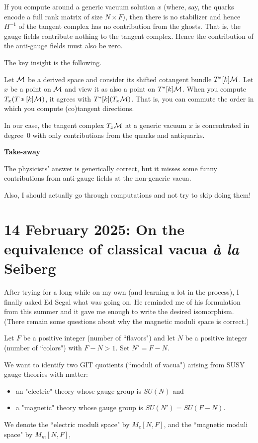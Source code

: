 \documentclass[11pt]{amsart}
\begin{document}
If you compute around a generic vacuum solution $x$ (where, say, the quarks encode a full rank matrix  of size $N \times F$), then there is no stabilizer and hence $H^{-1}$ of the tangent complex has no contribution from the ghosts. That is, the gauge fields contribute nothing to the tangent complex. Hence the contribution of the anti-gauge fields must also be zero.

The key insight is the following. 

Let $\mathcal M$ be a derived space and consider its shifted cotangent bundle $T^*[k]\mathcal M$. Let $x$ be a point on $\mathcal M$ and view it as also a point on $T^*[k]\mathcal M$. When you compute $T_x(T*[k]\mathcal M)$, it agrees with $T^*[k](T_x \mathcal M)$.  That is, you can commute the order in which you compute (co)tangent directions.

In our case, the tangent complex $T_x \mathcal M$ at a generic vacuum $x$ is concentrated in degree~0 with only contributions from the quarks and antiquarks.

{\bf Take-away}

The physicists' answer is generically correct, but it misses some funny contributions from anti-gauge fields at the non-generic vacua. 

Also, I should actually go through computations and not try to skip doing them!

\section{14 February 2025: On the equivalence of classical vacua {\it \`a la} Seiberg}

After trying for a long while on my own (and learning a lot in the process),
I finally asked Ed Segal what was going on.
He reminded me of his formulation from this summer and it gave me enough to write the desired isomorphism.
(There remain some questions about why the magnetic moduli space is correct.)

Let $F$ be a positive integer (number of ``flavors") and let $N$ be a positive integer (number of ``colors") with $F - N > 1$. 
Set $N' = F-N$.

We want to identify two GIT quotients (``moduli of vacua") arising from SUSY gauge theories with matter:
\begin{itemize}
\item an "electric" theory  whose gauge group is $SU(N)$ and
\item a "magnetic" theory whose gauge group is $SU(N') = SU(F-N)$.
\end{itemize}
We denote the ``electric moduli space" by $M_e[N,F]$, 
and the ``magnetic moduli space" by $M_m[N,F]$,
\end{document}

